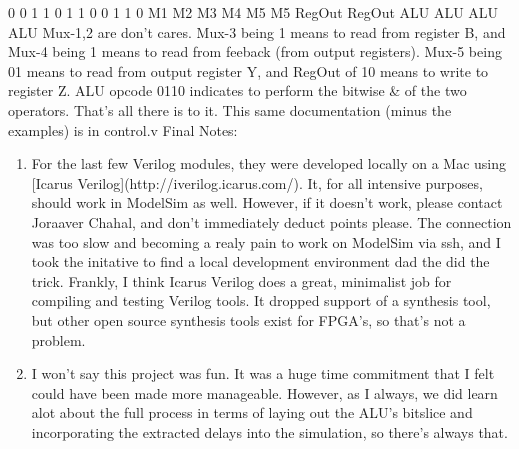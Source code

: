 \documentclass[12pt]{article}
\begin{document}
0  0  1  1  0  1  1      0      0   1   1   0
M1 M2 M3 M4 M5 M5 RegOut RegOut ALU ALU ALU ALU
\newline \newline
Mux-1,2 are don't cares. Mux-3 being 1 means to read from register B, and Mux-4 being 1 means to read from feeback (from output registers). Mux-5 being 01 means to read from output register Y, and RegOut of 10 means to write to register Z. ALU opcode 0110 indicates to perform the bitwise \& of the two operators. 
\newline \newline
That's all there is to it. This same documentation (minus the examples) is in control.v
\newline \newline
Final Notes:
\begin{enumerate}
	\item For the last few Verilog modules, they were developed locally on a Mac using [Icarus Verilog](http://iverilog.icarus.com/). It, 
	for all intensive purposes, should work in ModelSim as well. However, if it doesn't work, please contact Joraaver Chahal, and don't 
	immediately deduct points please. The connection was too slow and becoming a realy pain to work on ModelSim via ssh, and I took 
	the initative to find a local development environment dad the did the trick. Frankly, I think Icarus Verilog does a great, minimalist job 
	for compiling and testing Verilog tools. It dropped support of a synthesis tool, but other open source synthesis tools exist for 
	FPGA's, so that's not a problem.

	\item I won't say this project was fun. It was a huge time commitment that I felt could have been made more manageable. However, 
	as I always, we did learn alot about the full process in terms of laying out the ALU's bitslice and incorporating the extracted delays 
	into the simulation, so there's always that.
\end{enumerate}
\end{document}
